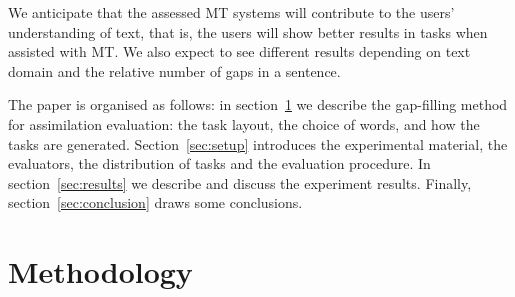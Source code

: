 \documentclass[11pt]{article}
\newcommand{\comment}[1]{}
\begin{document}
We anticipate that the assessed MT systems will contribute to the users' understanding of text, that is, the users will show better results in tasks when assisted with MT. We also expect to see different results depending on text domain and the relative number of gaps in a sentence.

The paper is organised as follows: in section~\ref{sec:methodology} we describe the gap-filling method for assimilation evaluation: the task layout, the choice of words, and how the tasks are generated. Section~\ref{sec:setup} introduces the experimental material, the evaluators, the distribution of tasks and the evaluation procedure. In section~\ref{sec:results} we describe and discuss the experiment results. Finally, section~\ref{sec:conclusion} draws some conclusions.


\section{Methodology}
\label{sec:methodology}


\comment{MLF the gap percentage table 2 is not referenced in the text; also, i have changed it to have the \textbf{Ref} row in the table?}
\end{document}
